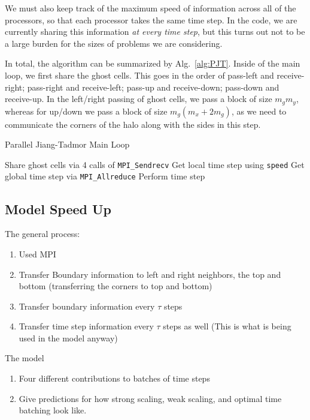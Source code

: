 \documentclass{article}
\begin{document}
We must also keep track of the maximum speed of information across all of the processors, so that each processor takes the same time step. In the code, we are currently sharing this information \textit{at every time step}, but this turns out not to be a large burden for the sizes of problems we are considering. 

In total, the algorithm can be summarized by Alg.~\ref{alg:PJT}. Inside of the main loop, we first share the ghost cells. This goes in the order of pass-left and receive-right; pass-right and receive-left; pass-up and receive-down; pass-down and receive-up. In the left/right passing of ghost cells, we pass a block of size $m_g m_y$, whereas for up/down we pass a block of size $m_g (m_x + 2m_g)$, as we need to communicate the corners of the halo along with the sides in this step. 
\begin{algorithm}
\caption{Parallel Jiang-Tadmor Main Loop}\label{alg:PJT}
\begin{algorithmic}
    \State Share ghost cells via 4 calls of \texttt{MPI\_Sendrecv}
        \State Get local time step using \texttt{speed}
        \State Get global time step via \texttt{MPI\_Allreduce}
        \State Perform time step
    \EndFor
\EndFor
\end{algorithmic}
\end{algorithm}

\subsection{Model Speed Up}



The general process:
\begin{enumerate}
	\item Used MPI
	\item Transfer Boundary information to left and right neighbors, the top and bottom (transferring the corners to top and bottom)
	\item Transfer boundary information every $\tau$ steps
	\item Transfer time step information every $\tau$ steps as well (This is what is being used in the model anyway)
\end{enumerate}
The model
\begin{enumerate}
	\item Four different contributions to batches of time steps
	\item Give predictions for how strong scaling, weak scaling, and optimal time batching look like.
\end{enumerate}
\end{document}
